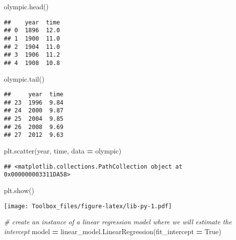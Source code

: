 \documentclass[
]{book}
\newenvironment{Shaded}{\begin{snugshade}}{\end{snugshade}}
\newcommand{\CommentTok}[1]{\textcolor[rgb]{0.56,0.35,0.01}{\textit{#1}}}
\newcommand{\NormalTok}[1]{#1}
\newcommand{\OperatorTok}[1]{\textcolor[rgb]{0.81,0.36,0.00}{\textbf{#1}}}
\newcommand{\StringTok}[1]{\textcolor[rgb]{0.31,0.60,0.02}{#1}}
\newcommand{\VariableTok}[1]{\textcolor[rgb]{0.00,0.00,0.00}{#1}}
\begin{document}
\begin{Shaded}
\begin{Highlighting}[]
\NormalTok{olympic.head()}
\end{Highlighting}
\end{Shaded}

\begin{verbatim}
##    year  time
## 0  1896  12.0
## 1  1900  11.0
## 2  1904  11.0
## 3  1906  11.2
## 4  1908  10.8
\end{verbatim}

\begin{Shaded}
\begin{Highlighting}[]
\NormalTok{olympic.tail()}
\end{Highlighting}
\end{Shaded}

\begin{verbatim}
##     year  time
## 23  1996  9.84
## 24  2000  9.87
## 25  2004  9.85
## 26  2008  9.69
## 27  2012  9.63
\end{verbatim}

\begin{Shaded}
\begin{Highlighting}[]
\NormalTok{plt.scatter(}\StringTok{\textquotesingle{}year\textquotesingle{}}\NormalTok{, }\StringTok{\textquotesingle{}time\textquotesingle{}}\NormalTok{, data }\OperatorTok{=}\NormalTok{ olympic)}
\end{Highlighting}
\end{Shaded}

\begin{verbatim}
## <matplotlib.collections.PathCollection object at 0x000000003311DA58>
\end{verbatim}

\begin{Shaded}
\begin{Highlighting}[]
\NormalTok{plt.show()}
\end{Highlighting}
\end{Shaded}

\texttt{[image: Toolbox\_files/figure-latex/lib-py-1.pdf]}

\begin{Shaded}
\begin{Highlighting}[]
\CommentTok{\# create an instance of a linear regression model where we will estimate the intercept}
\NormalTok{model }\OperatorTok{=}\NormalTok{ linear\_model.LinearRegression(fit\_intercept }\OperatorTok{=} \VariableTok{True}\NormalTok{)}
\end{Highlighting}
\end{Shaded}
\end{document}

